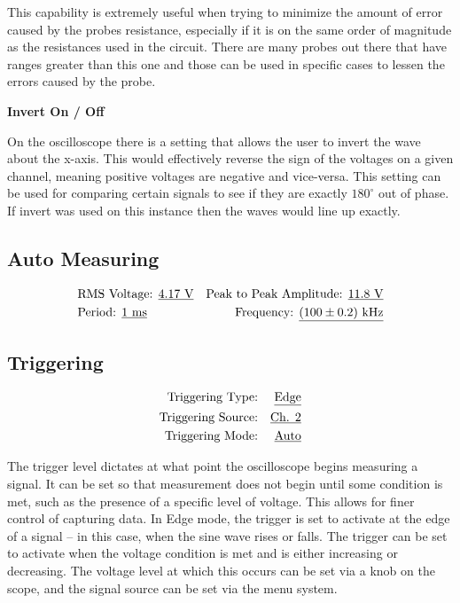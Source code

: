 \documentclass[twocolumn,english]{IEEEtran}
\theoremstyle{plain}
\theoremstyle{plain}
\begin{document}
This capability is extremely useful when trying to minimize the amount of error caused by the probes resistance, especially if it is on the same order of magnitude as the resistances used in the circuit. There are many probes out there that have ranges greater than this one and those can be used in specific cases to lessen the errors caused by the probe.

\noindent\textbf{Invert On / Off}

On the oscilloscope there is a setting that allows the user to invert the wave about the x-axis. This would effectively reverse the sign of the voltages on a given channel, meaning positive voltages are negative and vice-versa. This setting can be used for comparing certain signals to see if they are exactly $180^{\circ}$ out of phase. If invert was used on this instance then the waves would line up exactly.

\subsection{Auto Measuring}
\begin{align*}
 &\text{RMS Voltage: \underline{$4.17$ V}}	&\text{Peak to Peak Amplitude: \underline{$11.8$ V}} 	\\
 &\text{Period: \underline{$1$ ms}} 		&\text{Frequency: \underline{$(100 \pm 0.2)$ kHz}}	\\
\end{align*}

\subsection{Triggering}
\begin{align*}
 \text{Triggering Type:}&	&\text{\underline{Edge}}\\
 \text{Triggering Source:}&	&\text{\underline{Ch. 2}}\\
 \text{Triggering Mode:}&	&\text{\underline{Auto}}
\end{align*}

The trigger level dictates at what point the oscilloscope begins measuring a signal. It can be set so that measurement does not begin until some condition is met, such as the presence of a specific level of voltage. This allows for finer control of capturing data. In Edge mode, the trigger is set to activate at the edge of a signal -- in this case, when the sine wave rises or falls. The trigger can be set to activate when the voltage condition is met and is either increasing or decreasing. The voltage level at which this occurs can be set via a knob on the scope, and the signal source can be set via the menu system.
\end{document}
